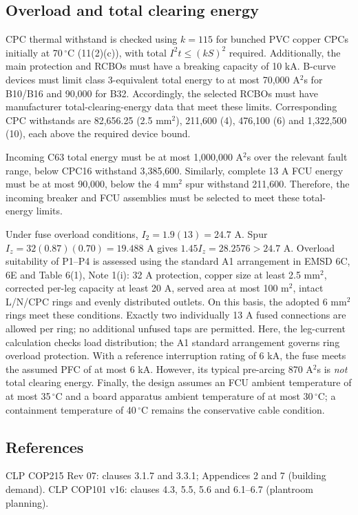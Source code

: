 \subsection*{Overload and total clearing energy}
CPC thermal withstand is checked using $k=115$ for bunched PVC copper CPCs initially at 70\,$^\circ$C (11(2)(c)), with total $I^2t\le(kS)^2$ required. Additionally, the main protection and RCBOs must have a breaking capacity of 10 kA. B-curve devices must limit class 3-equivalent total energy to at most 70,000 A$^2$s for B10/B16 and 90,000 for B32. Accordingly, the selected RCBOs must have manufacturer total-clearing-energy data that meet these limits. Corresponding CPC withstands are 82,656.25 (2.5 mm$^2$), 211,600 (4), 476,100 (6) and 1,322,500 (10), each above the required device bound.

Incoming C63 total energy must be at most 1,000,000 A$^2$s over the relevant fault range, below CPC16 withstand 3,385,600. Similarly, complete 13 A FCU energy must be at most 90,000, below the 4 mm$^2$ spur withstand 211,600. Therefore, the incoming breaker and FCU assemblies must be selected to meet these total-energy limits.

Under fuse overload conditions, $I_2=1.9(13)=24.7$ A. Spur $I_z=32(0.87)(0.70)=19.488$ A gives $1.45I_z=28.2576>24.7$ A. Overload suitability of P1--P4 is assessed using the standard A1 arrangement in EMSD 6C, 6E and Table 6(1), Note 1(i): 32 A protection, copper size at least 2.5 mm$^2$, corrected per-leg capacity at least 20 A, served area at most 100 m$^2$, intact L/N/CPC rings and evenly distributed outlets. On this basis, the adopted 6 mm$^2$ rings meet these conditions. Exactly two individually 13 A fused connections are allowed per ring; no additional unfused taps are permitted. Here, the leg-current calculation checks load distribution; the A1 standard arrangement governs ring overload protection. With a reference interruption rating of 6 kA, the fuse meets the assumed PFC of at most 6 kA. However, its typical pre-arcing 870 A$^2$s is \emph{not} total clearing energy. Finally, the design assumes an FCU ambient temperature of at most 35\,$^\circ$C and a board apparatus ambient temperature of at most 30\,$^\circ$C; a containment temperature of 40\,$^\circ$C remains the conservative cable condition.
\subsection*{References}
CLP COP215 Rev 07: clauses 3.1.7 and 3.3.1; Appendices 2 and 7 (building demand). CLP COP101 v16: clauses 4.3, 5.5, 5.6 and 6.1--6.7 (plantroom planning).

